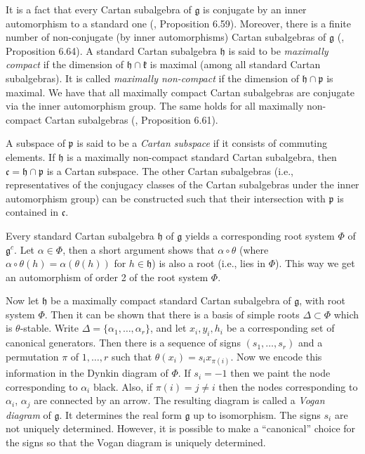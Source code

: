 \documentclass[a4paper,11pt]{report}
\begin{document}
{{ It is a fact that every Cartan subalgebra of $\mathfrak{g}$ is conjugate by an inner automorphism to a standard one (\cite{knapp}, Proposition 6.59). Moreover, there is a finite number of non-conjugate (by
inner automorphisms) Cartan subalgebras of $\mathfrak{g}$ (\cite{knapp}, Proposition 6.64). A standard Cartan subalgebra $\mathfrak{h}$ is said to be \emph{maximally compact} if the dimension of $\mathfrak{h}\cap \mathfrak{k}$ is maximal (among all standard Cartan subalgebras). It is called \emph{maximally non-compact} if the dimension of $\mathfrak{h}\cap \mathfrak{p}$ is maximal. We have that all maximally compact Cartan subalgebras are
conjugate via the inner automorphism group. The same holds for all maximally
non-compact Cartan subalgebras (\cite{knapp}, Proposition 6.61). 

 A subspace of $\mathfrak{p}$ is said to be a \emph{Cartan subspace} if it consists of commuting elements. If $\mathfrak{h}$ is a maximally non-compact standard Cartan subalgebra, then $\mathfrak{c} = \mathfrak{h}\cap \mathfrak{p}$ is a Cartan subspace. The other Cartan subalgebras (i.e., representatives of
the conjugacy classes of the Cartan subalgebras under the inner automorphism
group) can be constructed such that their intersection with $\mathfrak{p}$ is contained in $\mathfrak{c}$. 

 Every standard Cartan subalgebra $\mathfrak{h}$ of $\mathfrak{g}$ yields a corresponding root system $\Phi$ of $\mathfrak{g}^c$. Let $\alpha\in\Phi$, then a short argument shows that $\alpha\circ\theta$ (where $\alpha\circ\theta (h) = \alpha(\theta(h))$ for $h\in \mathfrak{h}$) is also a root (i.e., lies in $\Phi$). This way we get an automorphism of order 2 of the root system $\Phi$. 

 Now let $\mathfrak{h}$ be a maximally compact standard Cartan subalgebra of $\mathfrak{g}$, with root system $\Phi$. Then it can be shown that there is a basis of simple roots $\Delta\subset\Phi$ which is $\theta$-stable. Write $\Delta = \{\alpha_1,\ldots,\alpha_r\}$, and let $x_i,y_i,h_i$ be a corresponding set of canonical generators. Then there is a sequence of
signs $(s_1,\ldots,s_r)$ and a permutation $\pi$ of $1,\ldots,r$ such that $\theta(x_i) = s_i x_{\pi(i)}$. Now we encode this information in the Dynkin diagram of $\Phi$. If $s_i=-1$ then we paint the node corresponding to $\alpha_i$ black. Also, if $\pi(i)=j \neq i$ then the nodes corresponding to $\alpha_i$, $\alpha_j$ are connected by an arrow. The resulting diagram is called a \emph{Vogan diagram} of $\mathfrak{g}$. It determines the real form $\mathfrak{g}$ up to isomorphism. The signs $s_i$ are not uniquely determined. However, it is possible to make a ``canonical''
choice for the signs so that the Vogan diagram is uniquely determined. 

}}
\end{document}
